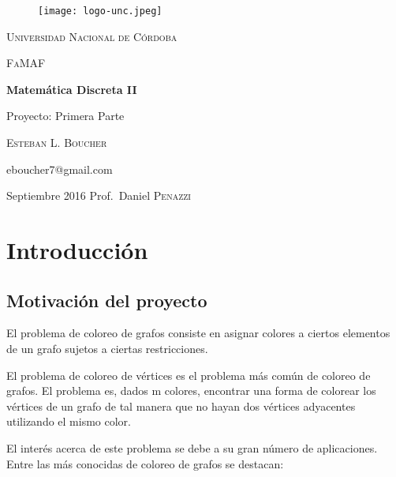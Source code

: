 \documentclass[11pt,a4paper]{article}
\theoremstyle{plain}
\begin{document}
\begin{titlepage}
	\centering

	\begin{figure}[htp]
	\centering
	\texttt{[image: logo-unc.jpeg]}
	\end{figure}
	
	{\scshape\Large\textsc{Universidad Nacional de Córdoba} \par}
	\vspace{0.5cm}
	{\scshape\large FaMAF\par}
	\vspace{1.5cm}

	{\LARGE\bfseries Matemática Discreta II\par}
	\vspace{.7cm}
	{\Large Proyecto: Primera Parte\par}
	\vspace{3cm}
	{\Large\scshape{Esteban L. Boucher}\par}
	\vspace{.4cm}
	{\large\ttfamily eboucher7@gmail.com\par}
	\vspace{.4cm}
	{\large Septiembre 2016}
	\vfill
	Prof.~Daniel \textsc{Penazzi}

	\date{Septiembre, 2016}
\end{titlepage}

\renewcommand\refname{}

\renewcommand{\contentsname}{Índice general}

\tableofcontents
\newpage
\section{Introducción}

	\subsection{Motivación del proyecto}

 El problema de coloreo de grafos consiste en asignar colores a ciertos elementos de un grafo sujetos a ciertas restricciones.

 El problema de coloreo de vértices es el problema más común de coloreo de grafos. El problema es, dados m colores, encontrar una forma de colorear los vértices de un grafo de tal manera que no hayan dos vértices adyacentes utilizando el mismo color.
 
 El interés acerca de este problema se debe a su gran número de aplicaciones. Entre las más conocidas de coloreo de grafos se destacan\cite {1}:
 
\end{document}
